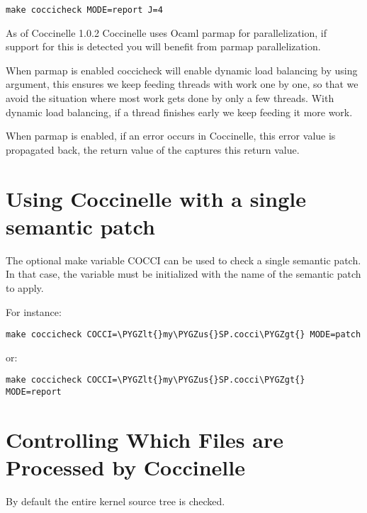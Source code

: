 \documentclass[a4paper,8pt,english]{sphinxmanual}
\def\PYGZus{\char`\_}
\def\PYGZlt{\char`\<}
\def\PYGZgt{\char`\>}
\begin{document}
\begin{Verbatim}[commandchars=\\\{\}]
make coccicheck MODE=report J=4
\end{Verbatim}

As of Coccinelle 1.0.2 Coccinelle uses Ocaml parmap for parallelization,
if support for this is detected you will benefit from parmap parallelization.

When parmap is enabled coccicheck will enable dynamic load balancing by using
 argument, this ensures we keep feeding threads with work
one by one, so that we avoid the situation where most work gets done by only
a few threads. With dynamic load balancing, if a thread finishes early we keep
feeding it more work.

When parmap is enabled, if an error occurs in Coccinelle, this error
value is propagated back, the return value of the 
captures this return value.


\section{Using Coccinelle with a single semantic patch}
\label{dev-tools/coccinelle:using-coccinelle-with-a-single-semantic-patch}
The optional make variable COCCI can be used to check a single
semantic patch. In that case, the variable must be initialized with
the name of the semantic patch to apply.

For instance:

\begin{Verbatim}[commandchars=\\\{\}]
make coccicheck COCCI=\PYGZlt{}my\PYGZus{}SP.cocci\PYGZgt{} MODE=patch
\end{Verbatim}

or:

\begin{Verbatim}[commandchars=\\\{\}]
make coccicheck COCCI=\PYGZlt{}my\PYGZus{}SP.cocci\PYGZgt{} MODE=report
\end{Verbatim}


\section{Controlling Which Files are Processed by Coccinelle}
\label{dev-tools/coccinelle:controlling-which-files-are-processed-by-coccinelle}
By default the entire kernel source tree is checked.
\end{document}
